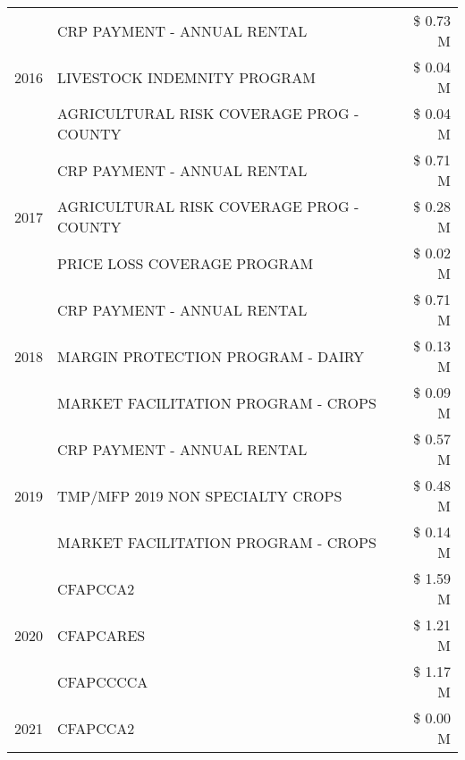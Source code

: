 \begin{tabular}{llr}
\cline{1-3}
\multirow[t]{3}{*}{2016} & CRP PAYMENT - ANNUAL RENTAL & \$ 0.73 M \\
 & LIVESTOCK INDEMNITY PROGRAM & \$ 0.04 M \\
 & AGRICULTURAL RISK COVERAGE PROG - COUNTY & \$ 0.04 M \\
\cline{1-3}
\multirow[t]{3}{*}{2017} & CRP PAYMENT - ANNUAL RENTAL & \$ 0.71 M \\
 & AGRICULTURAL RISK COVERAGE PROG - COUNTY & \$ 0.28 M \\
 & PRICE LOSS COVERAGE PROGRAM & \$ 0.02 M \\
\cline{1-3}
\multirow[t]{3}{*}{2018} & CRP PAYMENT - ANNUAL RENTAL & \$ 0.71 M \\
 & MARGIN PROTECTION PROGRAM - DAIRY & \$ 0.13 M \\
 & MARKET FACILITATION PROGRAM - CROPS & \$ 0.09 M \\
\cline{1-3}
\multirow[t]{3}{*}{2019} & CRP PAYMENT - ANNUAL RENTAL & \$ 0.57 M \\
 & TMP/MFP 2019 NON SPECIALTY CROPS & \$ 0.48 M \\
 & MARKET FACILITATION PROGRAM - CROPS & \$ 0.14 M \\
\cline{1-3}
\multirow[t]{3}{*}{2020} & CFAPCCA2 & \$ 1.59 M \\
 & CFAPCARES & \$ 1.21 M \\
 & CFAPCCCCA & \$ 1.17 M \\
\cline{1-3}
2021 & CFAPCCA2 & \$ 0.00 M \\
\cline{1-3}
\bottomrule
\end{tabular}
